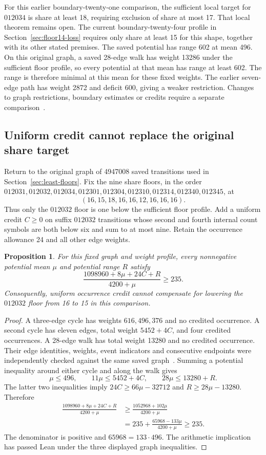 \documentclass[11pt,a4paper]{article}
\newtheorem{proposition}[theorem]{Proposition}
\theoremstyle{definition}
\theoremstyle{remark}
\begin{document}
For this earlier boundary-twenty-one comparison, the sufficient local
target for $012034$ is share at least 18, requiring exclusion of share
at most 17. That local theorem remains open. The current
boundary-twenty-four profile in Section~\ref{sec:floor14-loss} requires
only share at least 15 for this shape, together with its other stated
premises.
The saved potential has range 602 at mean 496. On this original graph, a
saved 28-edge walk has weight 13286 under the sufficient floor profile,
so every potential at that mean has range at least 602. The range is
therefore minimal at this mean for these fixed weights. The earlier
seven-edge path has weight 2872 and deficit 600, giving a weaker restriction.
Changes to graph restrictions, boundary estimates or credits require a
separate comparison~\cite{range156archive}.

\subsection{Uniform credit cannot replace the original share target}
\label{sec:share-credit-tradeoff}
Return to the original graph of 4947008 saved transitions used in
Section~\ref{sec:least-floors}. Fix the nine share floors, in the order
$012031,012032,012034,012301,012304,012310,012314,012340,012345$, at
\[
(16,15,18,16,16,12,16,16,16).
\]
Thus only the $012032$ floor is one below the sufficient floor profile.
Add a uniform credit $C\ge0$ on suffix $012032$ transitions whose second
and fourth internal count symbols are both below six and sum to at most
nine. Retain the occurrence allowance 24 and all other edge weights.

\begin{proposition}\label{prop:share15-credit-obstruction}
For this fixed graph and weight profile, every nonnegative potential mean
$\mu$ and potential range $R$ satisfy
\[
\frac{1098960+8\mu+24C+R}{4200+\mu}\ge235.
\]
Consequently, uniform occurrence credit cannot compensate for lowering
the $012032$ floor from 16 to 15 in this comparison.
\end{proposition}
\begin{proof}
A three-edge cycle has weights $616,496,376$ and no credited occurrence.
A second cycle has eleven edges, total weight $5452+4C$, and four credited
occurrences. A 28-edge walk has total weight 13280 and no credited occurrence.
Their edge identities, weights, event indicators and consecutive endpoints
were independently checked against the same saved graph~\cite{credittradeoffarchive}.
Summing a potential inequality around either cycle and along the walk gives
\[
\mu\le496,\qquad 11\mu\le5452+4C,\qquad 28\mu\le13280+R.
\]
The latter two inequalities imply $24C\ge66\mu-32712$ and
$R\ge28\mu-13280$. Therefore
\[
\begin{aligned}
\frac{1098960+8\mu+24C+R}{4200+\mu}
&\ge\frac{1052968+102\mu}{4200+\mu}\\
&=235+\frac{65968-133\mu}{4200+\mu}\ge235.
\end{aligned}
\]
The denominator is positive and $65968=133\cdot496$. The arithmetic
implication has passed Lean under the three displayed graph inequalities.
\end{proof}
\end{document}

